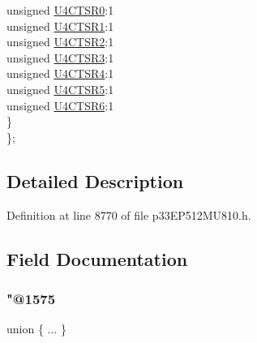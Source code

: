 \begin{DoxyCompactItemize}
\begin{tabbing}
\>\>unsigned \hyperlink{structtag_r_p_i_n_r28_b_i_t_s_a91460f872fe0ea9028f985b26ec60602}{U4CTSR0}:1\\
\>\>unsigned \hyperlink{structtag_r_p_i_n_r28_b_i_t_s_aa4af4c6e395e4e6bc0847616327f6e3d}{U4CTSR1}:1\\
\>\>unsigned \hyperlink{structtag_r_p_i_n_r28_b_i_t_s_acf2eb6ef760c52d99b2b7417fc2c7567}{U4CTSR2}:1\\
\>\>unsigned \hyperlink{structtag_r_p_i_n_r28_b_i_t_s_ae12b43ce008a13f065e3199f65889e72}{U4CTSR3}:1\\
\>\>unsigned \hyperlink{structtag_r_p_i_n_r28_b_i_t_s_ae3527e3da04fdf94b3005c11add920b2}{U4CTSR4}:1\\
\>\>unsigned \hyperlink{structtag_r_p_i_n_r28_b_i_t_s_aba2b2ab2341da2aa7e492b5d113f81f1}{U4CTSR5}:1\\
\>\>unsigned \hyperlink{structtag_r_p_i_n_r28_b_i_t_s_a56f9d698f3ac927a756dd443b0383633}{U4CTSR6}:1\\
\>\} \\
\}; \\

\end{tabbing}\end{DoxyCompactItemize}


\subsection{Detailed Description}


Definition at line 8770 of file p33\+E\+P512\+M\+U810.\+h.



\subsection{Field Documentation}
\mbox{\label{structtag_r_p_i_n_r28_b_i_t_s_a139f680214da310e893bdb0044f493b1}} 
\subsubsection{\texorpdfstring{"@1575}{@1575}}
{\footnotesize\ttfamily union \{ ... \} }

\mbox{\label{structtag_r_p_i_n_r28_b_i_t_s_adf71f3d8410c1f1dbbc96680a92c49af}} 
